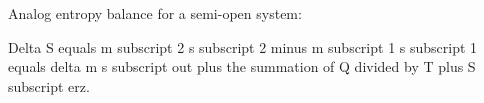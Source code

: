 Analog entropy balance for a semi-open system:  

Delta S equals m subscript 2 s subscript 2 minus m subscript 1 s subscript 1 equals delta m s subscript out plus the summation of Q divided by T plus S subscript erz.